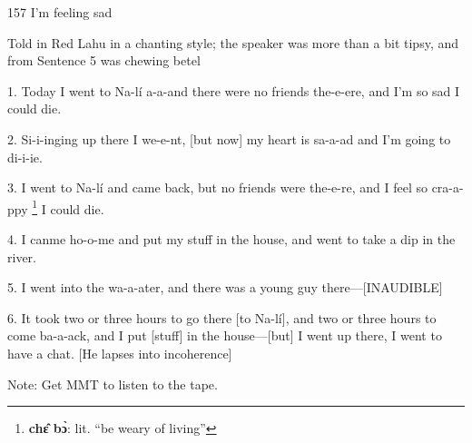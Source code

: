 
157 I'm feeling sad

Told in Red Lahu in a chanting style; the speaker was more than a bit tipsy, and
from Sentence 5 was chewing betel

1. Today I went to Na-lí a-a-and there were no friends the-e-ere, and I'm so sad
I could die.

2. Si-i-inging up there I we-e-nt, [but now] my heart is sa-a-ad and I'm going
to di-i-ie.

3. I went to Na-lí and came back, but no friends were the-e-re, and I feel so
cra-a-ppy \footnote{\textbf{chɛ̂ bɔ̀}: lit. ``be weary of living''} I could die.

4. I canme ho-o-me and put my stuff in the house, and went to take a dip in the
river.

5. I went into the wa-a-ater, and there was a young guy there---[INAUDIBLE]

6. It took two or three hours to go there [to Na-lí], and two or three hours to
come ba-a-ack, and I put [stuff] in the house---[but] I went up there, I went to
have a chat. [He lapses into incoherence]

Note: Get MMT to listen to the tape.

